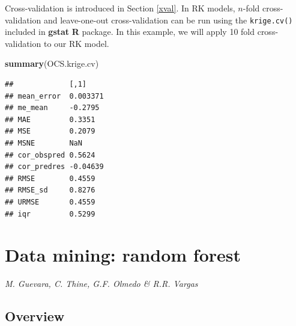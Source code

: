 \documentclass[10pt,b5paper,]{book}
\newenvironment{Shaded}{\begin{snugshade}}{\end{snugshade}}
\newcommand{\CommentTok}[1]{\textcolor[rgb]{0.56,0.35,0.01}{\textit{#1}}}
\newcommand{\DataTypeTok}[1]{\textcolor[rgb]{0.13,0.29,0.53}{#1}}
\newcommand{\DecValTok}[1]{\textcolor[rgb]{0.00,0.00,0.81}{#1}}
\newcommand{\KeywordTok}[1]{\textcolor[rgb]{0.13,0.29,0.53}{\textbf{#1}}}
\newcommand{\NormalTok}[1]{#1}
\newcommand{\OperatorTok}[1]{\textcolor[rgb]{0.81,0.36,0.00}{\textbf{#1}}}
\newcommand{\StringTok}[1]{\textcolor[rgb]{0.31,0.60,0.02}{#1}}
\theoremstyle{definition}
\theoremstyle{definition}
\theoremstyle{definition}
\theoremstyle{remark}
\begin{document}
Cross-validation  is introduced in Section
\ref{xval}. In RK models, \(n\)-fold cross-validation and leave-one-out
cross-validation can be run using the \texttt{krige.cv()} included in
\textbf{gstat} \textbf{R} package. In this example, we will apply 10
fold cross-validation to our RK model.

\begin{Shaded}
\end{Shaded}

\begin{Shaded}
\begin{Highlighting}[]
\KeywordTok{summary}\NormalTok{(OCS.krige.cv)}
\end{Highlighting}
\end{Shaded}

\begin{verbatim}
##             [,1]    
## mean_error  0.003371
## me_mean     -0.2795 
## MAE         0.3351  
## MSE         0.2079  
## MSNE        NaN     
## cor_obspred 0.5624  
## cor_predres -0.04639
## RMSE        0.4559  
## RMSE_sd     0.8276  
## URMSE       0.4559  
## iqr         0.5299
\end{verbatim}

\clearpage

\hypertarget{rf}{%
\section{Data mining: random forest}\label{rf}}

\emph{M. Guevara, C. Thine, G.F. Olmedo \& R.R. Vargas}

\hypertarget{overview-2}{%
\subsection{Overview}\label{overview-2}}
\end{document}
